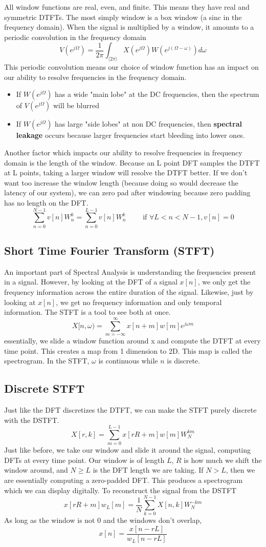 \documentclass{article}
\begin{document}
All window functions are real, even, and finite. This means they have real and symmetric DTFTs. The most simply window is a box window (a sinc in the frequency domain).
When the signal is multiplied by a window, it amounts to a periodic convolution in the frequency domain
$$V(e^{j\Omega})=\frac{1}{2\pi}\int_{\langle 2\pi \rangle}X(e^{j\Omega})W(e^{j(\Omega-\omega)})d\omega$$
This periodic convolution means our choice of window function has an impact on our ability to resolve frequencies in the frequency domain.
\begin{itemize}
  \item If $W(e^{j\Omega})$ has a wide "main lobe" at the DC frequencies, then the spectrum of $V(e^{j\Omega})$ will be blurred
  \item If $W(e^{j\Omega})$ has large "side lobes" at non DC frequencies, then \textbf{spectral leakage} occurs because larger frequencies start bleeding into lower ones.
\end{itemize}
Another factor which impacts our ability to resolve frequencies in frequency domain is the length of the window. Because an L point DFT samples the DTFT at L points,
taking a larger window will resolve the DTFT better. If we don't want too increase the window length (because doing so would decrease the latency of our system), we can
zero pad after windowing because zero padding has no length on the DFT.
$$\sum_{n=0}^{N-1}{v[n]W_n^k} = \sum_{n=0}^{L-1}{v[n]W_n^k}\qquad \text{ if } \forall L<n<N-1,v[n]=0$$
\subsection{Short Time Fourier Transform (STFT)}
An important part of Spectral Analysis is understanding the frequencies present in a signal. However, by looking at the DFT of a signal $x[n]$, we only get the frequency information
across the entire duration of the signal. Likewise, just by looking at $x[n]$, we get no frequency information and only temporal information. The STFT is a tool to see both at once.
$$X[n, \omega) = \sum_{m=-\infty}^{\infty}x[n+m]w[m]e^{j\omega m}$$
essentially, we slide a window function around x and compute the DTFT at every time point. This creates a map from 1 dimension to 2D. This map is called the spectrogram.
In the STFT, $\omega$ is continuous while $n$ is discrete.
\subsection{Discrete STFT}
Just like the DFT discretizes the DTFT, we can make the STFT purely discrete with the DSTFT.
$$X[r, k] = \sum_{m=0}^{L-1}x[rR+m]w[m]W_N^{km}$$
Just like before, we take our window and slide it around the signal, computing DFTs at every time point.
Our window is of length $L$, $R$ is how much we shift the window around, and $N \ge L$ is the DFT length we are taking.
If $N > L$, then we are essentially computing a zero-padded DFT. This produces a spectrogram which we can display digitally.
To reconstruct the signal from the DSTFT
$$x[rR+m]w_L[m] = \frac{1}{N}\sum_{k=0}^{N-1}X[n, k]W_N^{-km}$$
As long as the window is not 0 and the windows don't overlap, $$x[n] = \frac{x[n-rL]}{w_L[n-rL]}$$
\end{document}
